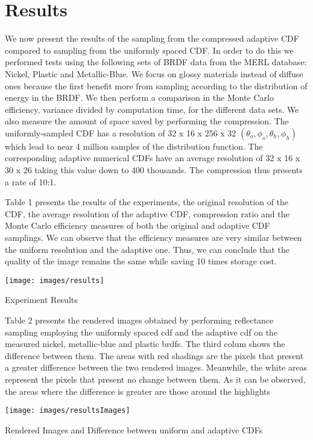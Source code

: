 \documentclass[conference]{acmsiggraph}
\begin{document}
\section{Results}
We now present the results of the sampling from the compressed adaptive CDF compared to sampling from the uniformly spaced CDF. In order to do this we performed tests using the following sets of BRDF data from the MERL database: Nickel, Plastic and Metallic-Blue. We focus on glossy materials instead of diffuse ones because the first benefit more from sampling according to the distribution of energy in the BRDF. We then perform a comparison in the Monte Carlo efficiency, variance divided by computation time, for the different data sets. We also measure the amount of space saved by performing the compression. The uniformly-sampled CDF has a resolution of 32 x 16 x 256 x 32 $(\theta_{o}, \phi_{o}, \theta_{h}, \phi_{h})$ which lead to near 4 million samples of the distribution function. The corresponding adaptive numerical CDFs have an average resolution of 32 x 16 x 30 x 26 taking this value down to 400 thousands. The compression thus presents a rate of 10:1. 

Table 1 presents the results of the experiments, the original resolution of the CDF, the average resolution of the adaptive CDF, compression ratio and the Monte Carlo efficiency measures of both the original and adaptive CDF samplings. We can observe that the efficiency measures are very similar between the uniform resolution and the adaptive one. Thus, we can conclude that the quality of the image remains the same while saving 10 times storage cost.

\begin{table}[ht]
  \centering
  \texttt{[image: images/results]}
  \caption{Experiment Results}
\end{table}

Table 2 presents the rendered images obtained by performing reflectance sampling employing the uniformly spaced cdf and the adaptive cdf on the measured nickel, metallic-blue and plastic brdfs. The third colum shows the difference between them. The areas with red shadings are the pixels that present a greater difference between the two rendered images. Meanwhile, the white areas represent the pixels that present no change between them. As it can be observed, the areas where the difference is greater are those around the highlights  

\begin{table}[ht]
  \centering
  \texttt{[image: images/resultsImages]}
  \caption{Rendered Images and Difference between uniform and adaptive CDFs}
\end{table}
\end{document}
